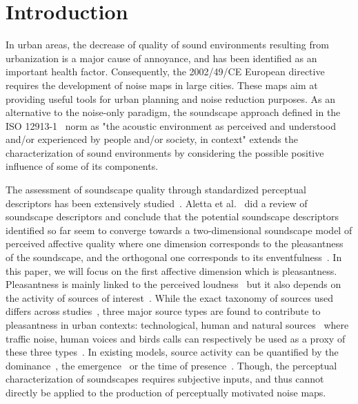 \documentclass[11pt,a4paper]{article}
\begin{document}
\section{Introduction}
\label{sec:intro}
In urban areas, the decrease of quality of sound environments resulting from urbanization is a major cause of annoyance, and has been identified as an important health factor. Consequently, the 2002/49/CE European directive~\cite{ec2002} requires the development of noise maps in large cities. These maps aim at providing useful tools for urban planning and noise reduction purposes. As an alternative to the noise-only paradigm, the soundscape approach defined in the ISO 12913-1~\cite{iso2014} norm as "the acoustic environment as perceived and understood and/or experienced by people and/or society, in context" extends the characterization of sound environments by considering the possible positive influence of some of its components.

The assessment of soundscape quality through standardized perceptual descriptors has been extensively studied~\cite{viollon2000, axelsson2010, cain2013, jeon2018, aletta2016}. Aletta et al.~\cite{aletta2016} did a review of soundscape descriptors and conclude that the potential soundscape descriptors identified so far seem to converge towards a two-dimensional soundscape model of perceived affective quality where one dimension corresponds to the pleasantness of the soundscape, and the orthogonal one corresponds to its enventfulness~\cite{axelsson2010, aumond2017, delaitre2014}. In this paper, we will focus on the first affective dimension which is pleasantness. Pleasantness is mainly linked to the perceived loudness~\cite{blauert1997, jekosch2004} but it also depends on the activity of sources of interest~\cite{nilsson2007, perez2012}. While the exact taxonomy of sources used differs across studies~\cite{guastavino2007, gygi2007, salamon2014, brown2011}, three major source types are found to contribute to pleasantness in urban contexts: technological, human and natural sources~\cite{nilsson2007, axelsson2010} where traffic noise, human voices and birds calls can respectively be used as a proxy of these three types~\cite{lavandier2006, ricciardi2014, aumond2017}. In existing models, source activity can be quantified by the dominance~\cite{hong2017}, the emergence~\cite{guastavino2006} or the time of presence~\cite{ricciardi2014}. Though, the perceptual characterization of soundscapes requires subjective inputs, and thus cannot directly be applied to the production of perceptually motivated noise maps.
\end{document}

